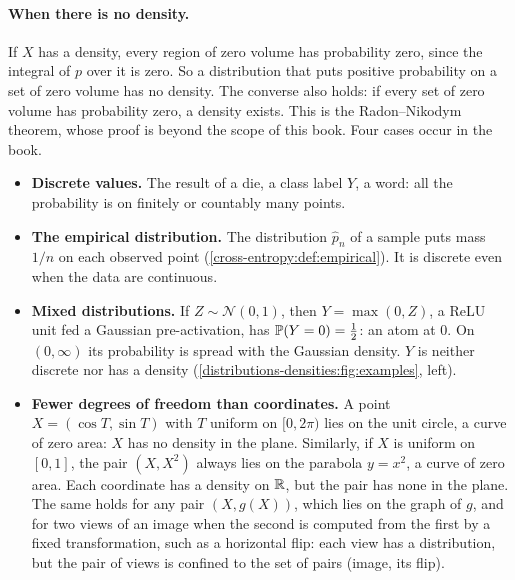 \begin{notechapter}
\paragraph{When there is no density.} If $X$ has a density, every region of zero volume has
probability zero, since the integral of $p$ over it is zero. So a distribution that puts positive
probability on a set of zero volume has no density. The converse also holds: if every set of zero
volume has probability zero, a density exists. This is the Radon--Nikodym theorem, whose proof is
beyond the scope of this book. Four cases occur in the book.
\begin{itemize}
  \item \textbf{Discrete values.} The result of a die, a class label $Y$, a word: all the probability is on
        finitely or countably many points.
  \item \textbf{The empirical distribution.} The distribution $\hat p_n$ of a sample puts mass $1/n$ on each
        observed point (\cref{cross-entropy:def:empirical}). It is discrete even when the data are
        continuous.
  \item \textbf{Mixed distributions.} If $Z\sim\mathcal N(0, 1)$, then $Y = \max(0, Z)$, a ReLU unit fed a
        Gaussian pre-activation, has $\mathbb{P}(Y = 0) = \frac12$: an atom at $0$. On $(0, \infty)$ its
        probability is spread with the Gaussian density. $Y$ is neither discrete nor has a density
        (\cref{distributions-densities:fig:examples}, left).
  \item \textbf{Fewer degrees of freedom than coordinates.} A point $X = (\cos T, \sin T)$ with $T$ uniform on
        $[0, 2\pi)$ lies on the unit circle, a curve of zero area: $X$ has no density in the plane. Similarly,
        if $X$ is uniform on $[0, 1]$, the pair $(X, X^2)$ always lies on the parabola $y = x^2$, a curve of
        zero area. Each coordinate has a density on $\mathbb{R}$, but the pair has none in the plane. The same holds
        for any pair $(X, g(X))$, which lies on the graph of $g$, and for two views of an image when the second
        is computed from the first by a fixed transformation, such as a horizontal flip: each view has a
        distribution, but the pair of views is confined to the set of pairs (image, its flip).
\end{itemize}


\end{notechapter}
